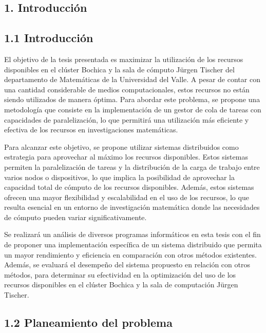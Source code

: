 \begin{spacing}{1.5}
  \begin{tightcenter}
    \section{1. Introducción}
    \mylinespacing
  \end{tightcenter}


  \subsection{1.1  Introducción}
  El objetivo de la tesis presentada es maximizar la utilización de los recursos disponibles en el clúster Bochica y la sala de cómputo Jürgen Tischer del departamento de Matemáticas de la Universidad del Valle. A pesar de contar con una cantidad considerable de medios computacionales, estos recursos no están siendo utilizados de manera óptima. Para abordar este problema, se propone una metodología que consiste en la implementación de un gestor de cola de tareas con capacidades de paralelización, lo que permitirá una utilización más eficiente y efectiva de los recursos en investigaciones matemáticas.

  Para alcanzar este objetivo, se propone utilizar sistemas distribuidos como estrategia para aprovechar al máximo los recursos disponibles. Estos sistemas permiten la paralelización de tareas y la distribución de la carga de trabajo entre varios nodos o dispositivos, lo que implica la posibilidad de aprovechar la capacidad total de cómputo de los recursos disponibles. Además, estos sistemas ofrecen una mayor flexibilidad y escalabilidad en el uso de los recursos, lo que resulta esencial en un entorno de investigación matemática donde las necesidades de cómputo pueden variar significativamente.

  Se realizará un análisis de diversos programas informáticos en esta tesis con el fin de proponer una implementación específica de un sistema distribuido que permita un mayor rendimiento y eficiencia en comparación con otros métodos existentes. Además, se evaluará el desempeño del sistema propuesto en relación con otros métodos, para determinar su efectividad en la optimización del uso de los recursos disponibles en el clúster Bochica y la sala de computación Jürgen Tischer.

  \subsection{1.2 Planeamiento del problema}


\end{spacing}
